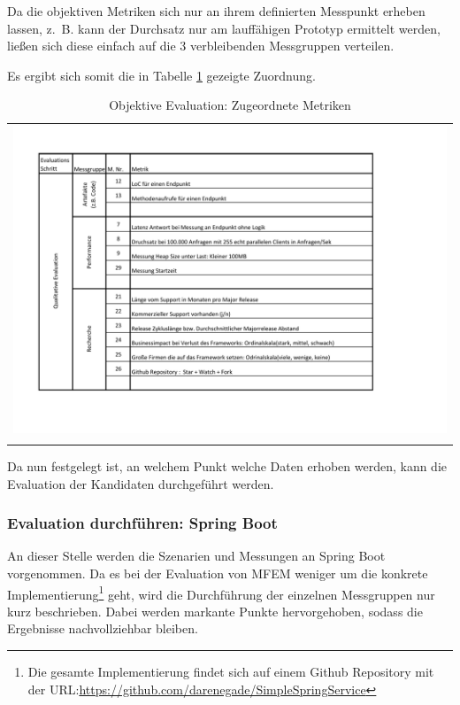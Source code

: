 Da die objektiven Metriken sich nur an ihrem definierten Messpunkt erheben lassen, z.~B. kann der Durchsatz nur am lauffähigen Prototyp ermittelt werden, ließen sich diese einfach auf die 3 verbleibenden Messgruppen verteilen. 

Es ergibt sich somit die in Tabelle \ref{ObjekEvalMetriken} gezeigte Zuordnung. 

\begin{longtable}{c}
	\includegraphics[width=\linewidth]{Bilder/ObjekEvalMetriken.pdf} \\	
	\caption[Metriken Objektive Evaluation]{Objektive Evaluation: Zugeordnete Metriken}
	\label{ObjekEvalMetriken}\\
\end{longtable}
\FloatBarrier

Da nun festgelegt ist, an welchem Punkt welche Daten erhoben werden, kann die Evaluation der Kandidaten durchgeführt werden.

\subsubsection{Evaluation durchführen: Spring Boot}

An dieser Stelle werden die Szenarien und Messungen an Spring Boot vorgenommen. Da es bei der Evaluation von \ac{MFEM} weniger um die konkrete Implementierung\footnote{
	Die gesamte Implementierung findet sich auf einem Github Repository mit der URL:\url{https://github.com/darenegade/SimpleSpringService}
} 
 geht, wird die Durchführung der einzelnen Messgruppen nur kurz beschrieben. Dabei werden markante Punkte hervorgehoben, sodass die Ergebnisse nachvollziehbar bleiben. 

